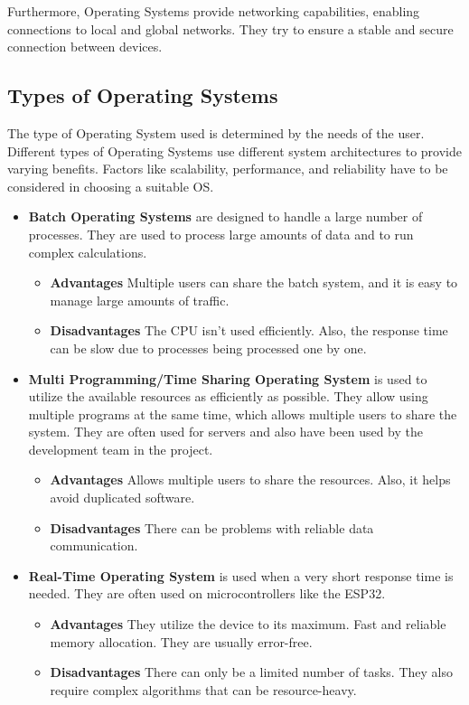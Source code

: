 Furthermore, Operating Systems provide networking capabilities, enabling connections to local and global networks. They try to ensure a stable and secure connection between devices.

\cite{WhatIsAnOs}

\subsection {Types of Operating Systems}

The type of Operating System used is determined by the needs of the user. 
Different types of Operating Systems use different system architectures to provide varying benefits.
Factors like scalability, performance, and reliability have to be considered in choosing a suitable OS.

\begin{itemize}

    \item \textbf{Batch Operating Systems} are designed to handle a large number of processes. They are used to process large amounts of data and to run complex calculations.
    \begin{itemize}
        \item \textbf{Advantages} Multiple users can share the batch system, and it is easy to manage large amounts of traffic.
        \item \textbf{Disadvantages} The CPU isn't used efficiently. Also, the response time can be slow due to processes being processed one by one.
    \end{itemize} 

    \item \textbf{Multi Programming/Time Sharing Operating System} is used to utilize the available resources as efficiently as possible. They allow using multiple programs at the same time, which allows multiple users to share the system.
    They are often used for servers and also have been used by the development team in the project.

    \begin{itemize}
        \item \textbf{Advantages} Allows multiple users to share the resources. Also, it helps avoid duplicated software.
        \item \textbf{Disadvantages} There can be problems with reliable data communication. 
    \end{itemize} 

    \item \textbf{Real-Time Operating System} is used when a very short response time is needed. They are often used on microcontrollers like the ESP32.
    \begin{itemize}
        \item \textbf{Advantages} They utilize the device to its maximum. Fast and reliable memory allocation. They are usually error-free.
        \item \textbf{Disadvantages} There can only be a limited number of tasks. They also require complex algorithms that can be resource-heavy.
    \end{itemize} 

\end{itemize}   

